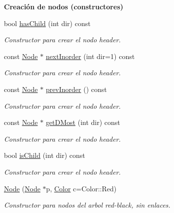\begin{Indent}{\bf Creación de nodos (constructores)}
\begin{DoxyCompactItemize}
bool \hyperlink{structaed2_1_1map_1_1Node_afe6fb054255e6b83c1a64783641f9f13_afe6fb054255e6b83c1a64783641f9f13}{has\+Child} (int dir) const 
\begin{DoxyCompactList}\small\item\em Constructor para crear el nodo header. \end{DoxyCompactList}\item 
const \hyperlink{structaed2_1_1map_1_1Node}{Node} $\ast$ \hyperlink{structaed2_1_1map_1_1Node_a10306c36697bb40f5824467ad1265e2c_a10306c36697bb40f5824467ad1265e2c}{next\+Inorder} (int dir=1) const 
\begin{DoxyCompactList}\small\item\em Constructor para crear el nodo header. \end{DoxyCompactList}\item 
const \hyperlink{structaed2_1_1map_1_1Node}{Node} $\ast$ \hyperlink{structaed2_1_1map_1_1Node_a9cdfce1b8a6d93f0e34ffcd4e0c6a1dc_a9cdfce1b8a6d93f0e34ffcd4e0c6a1dc}{prev\+Inorder} () const 
\begin{DoxyCompactList}\small\item\em Constructor para crear el nodo header. \end{DoxyCompactList}\item 
const \hyperlink{structaed2_1_1map_1_1Node}{Node} $\ast$ \hyperlink{structaed2_1_1map_1_1Node_aa6701efb52999be16d2ce9b50e147f36_aa6701efb52999be16d2ce9b50e147f36}{get\+D\+Most} (int dir) const 
\begin{DoxyCompactList}\small\item\em Constructor para crear el nodo header. \end{DoxyCompactList}\item 
bool \hyperlink{structaed2_1_1map_1_1Node_a78b4db7d625567a180aa2d3ee5f7efec_a78b4db7d625567a180aa2d3ee5f7efec}{is\+Child} (int dir) const 
\begin{DoxyCompactList}\small\item\em Constructor para crear el nodo header. \end{DoxyCompactList}\item 
\hyperlink{structaed2_1_1map_1_1Node_a62b5a42e88e219d53af8237a9ebedb6e_a62b5a42e88e219d53af8237a9ebedb6e}{Node} (\hyperlink{structaed2_1_1map_1_1Node}{Node} $\ast$p, \hyperlink{classaed2_1_1map_a6d62a415a4b9d320b30cada4ebcf9f5b_a6d62a415a4b9d320b30cada4ebcf9f5b}{Color} c=Color\+::\+Red)
\begin{DoxyCompactList}\small\item\em Constructor para nodos del arbol red-\/black, sin enlaces. \end{DoxyCompactList}\end{DoxyCompactItemize}
\end{Indent}
